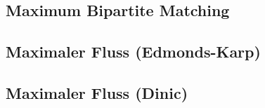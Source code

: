 %


%



%


%

%

\subsection{Maximum Bipartite Matching}


\subsection{Maximaler Fluss (Edmonds-Karp)}


\subsection{Maximaler Fluss (Dinic)}



